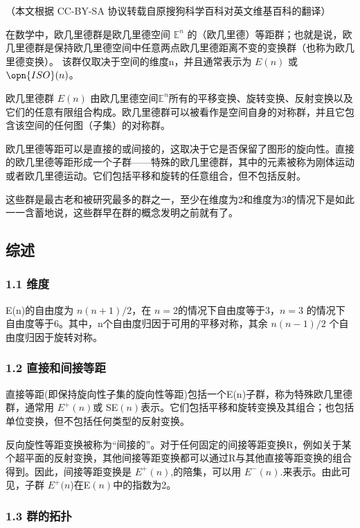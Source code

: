 
（本文根据 CC-BY-SA 协议转载自原搜狗科学百科对英文维基百科的翻译）

在数学中，欧几里德群是欧几里德空间 $\mathbb E^n$ 的（欧几里德）等距群；也就是说，欧几里德群是保持欧几里德空间中任意两点欧几里德距离不变的变换群（也称为欧几里德变换）。 该群仅取决于空间的维度n，并且通常表示为 $E(n)$ 或 $\opn{ISO}(n)$。

欧几里德群 $E(n)$ 由欧几里德空间$\mathbb E^n$所有的平移变换、旋转变换、反射变换以及它们的任意有限组合构成。欧几里德群可以被看作是空间自身的对称群，并且它包含该空间的任何图（子集）的对称群。

欧几里德等距可以是直接的或间接的，这取决于它是否保留了图形的旋向性。直接的欧几里德等距形成一个子群——特殊的欧几里德群，其中的元素被称为刚体运动或者欧几里德运动。它们包括平移和旋转的任意组合，但不包括反射。

这些群是最古老和被研究最多的群之一，至少在维度为2和维度为3的情况下是如此一一含蓄地说，这些群早在群的概念发明之前就有了。

\subsection{综述}

\subsubsection{1.1 维度}

E(n)的自由度为 $n(n + 1)/2$，在 $n = 2$的情况下自由度等于3，$n = 3$ 的情况下自由度等于6。其中，n个自由度归因于可用的平移对称，其余 $n(n-1)/2$ 个自由度归因于旋转对称。

\subsubsection{1.2 直接和间接等距}

直接等距(即保持旋向性子集的旋向性等距)包括一个E(n)子群，称为特殊欧几里德群，通常用 $E^+(n)$或 SE$(n)$表示。它们包括平移和旋转变换及其组合；也包括单位变换，但不包括任何类型的反射变换。

反向旋性等距变换被称为“间接的”。对于任何固定的间接等距变换R，例如关于某个超平面的反射变换，其他间接等距变换都可以通过R与其他直接等距变换的组合得到。因此，间接等距变换是 $E^+(n)$,的陪集，可以用 $E^-(n)$.来表示。由此可见，子群 $E^+(n$)在E$(n)$中的指数为2。

\subsubsection{1.3 群的拓扑}

